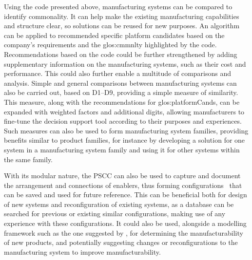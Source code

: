 Using the code presented above, manufacturing systems can be compared to identify commonality.
It can help make the existing manufacturing capabilities and structure clear, so solutions can be reused for new purposes.
An algorithm can be applied to recommended specific platform candidates based on the company's requirements and the \gls{glos:cmmnlty} highlighted by the code.
Recommendations based on the code could be further strengthened by adding supplementary information on the manufacturing systems, such as their cost and performance.
This could also further enable a multitude of comparisons and analysis.
Simple and general comparisons between manufacturing systems can also be carried out, \eg{} based on D1--D9, providing a simple measure of similarity.
This measure, along with the recommendations for \gls{glos:platformCand}s, can be expanded with weighted factors and additional digits, allowing manufacturers to fine-tune the decision support tool according to their purposes and experiences.
Such measures can also be used to form manufacturing system families, providing benefits similar to product families, for instance by developing a solution for one system in a manufacturing system family and using it for other systems within the same family.

With its modular nature, the PSCC can also be used to capture and document the arrangement and connections of enablers, thus forming configurations~\parencite{HU2011715} that can be saved and used for future reference.
This can be beneficial both for design of new systems and reconfiguration of existing systems, as a database can be searched for previous or existing similar configurations, making use of any experience with these configurations.
It could also be used, alongside a modelling framework such as the one suggested by \textcite{BRUNOE2018592}, for determining the manufacturability of new products, and potentially suggesting changes or reconfigurations to the manufacturing system to improve manufacturability.

